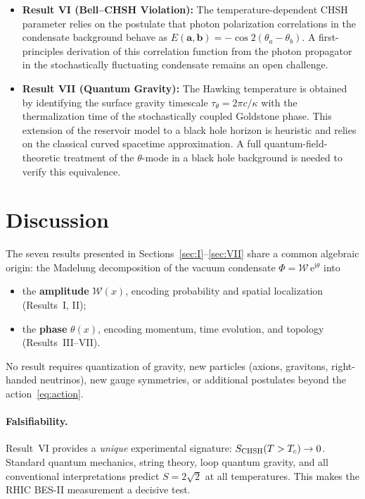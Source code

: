\documentclass[12pt,a4paper]{article}
\theoremstyle{plain}
\theoremstyle{definition}
\theoremstyle{remark}
\newcommand{\Wc}{\mathcal{W}}
\newcommand{\ee}{\mathrm{e}}
\newcommand{\ii}{\mathrm{i}}
\begin{document}
\begin{itemize}
  \item \textbf{Result VI (Bell--CHSH Violation):} The temperature-dependent CHSH parameter relies on the postulate that photon polarization correlations in the condensate background behave as $E(\bm{a},\bm{b}) = -\cos 2(\theta_a - \theta_b)$. A first-principles derivation of this correlation function from the photon propagator in the stochastically fluctuating condensate remains an open challenge.
  
  \item \textbf{Result VII (Quantum Gravity):} The Hawking temperature is obtained by identifying the surface gravity timescale $\tau_\theta = 2\pi c/\kappa$ with the thermalization time of the stochastically coupled Goldstone phase. This extension of the reservoir model to a black hole horizon is heuristic and relies on the classical curved spacetime approximation. A full quantum-field-theoretic treatment of the $\theta$-mode in a black hole background is needed to verify this equivalence.
\end{itemize}


\section{Discussion}\label{sec:discussion}

The seven results presented in
Sections~\ref{sec:I}--\ref{sec:VII} share a common algebraic
origin: the Madelung decomposition of the vacuum condensate
$\Phi = \Wc\,\ee^{\ii\theta}$ into
\begin{itemize}
  \item the \textbf{amplitude} $\Wc(x)$, encoding probability
    and spatial localization (Results~I, II);
  \item the \textbf{phase} $\theta(x)$, encoding momentum, time
    evolution, and topology (Results~III--VII).
\end{itemize}
No result requires quantization of gravity, new particles
(axions, gravitons, right-handed neutrinos), new gauge
symmetries, or additional postulates beyond the
action~\eqref{eq:action}.

\paragraph{Falsifiability.}
Result~VI provides a \emph{unique} experimental signature:
$S_{\rm CHSH}(T > T_c) \to 0$.  Standard quantum mechanics,
string theory, loop quantum gravity, and all conventional
interpretations predict $S = 2\sqrt{2}$ at all temperatures.
This makes the RHIC BES-II measurement a decisive test.
\end{document}
